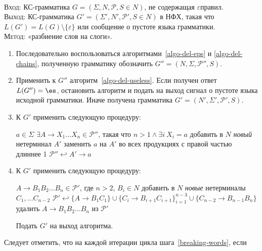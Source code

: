 \begin{NumAlgo}
\nspace\\
\textsc{Вход}: КС-грамматика $G=(\Sigma, N, \mathcal P, S \in N)$, не
содержащая $\varepsilon$\nbdash{}правил.\\ 
\textsc{Выход}: КС-грамматика
$G'=(\Sigma', N', \mathcal P', S \in N)$ в НФХ, такая что $L(G')=L(G) \setminus
\{ \varepsilon \}$ или сообщение о пустоте языка грамматики.\\
\textsc{Метод}: «разбиение слов на слоги».
\begin{enumerate}
    \item Последовательно воспользоваться
    алгоритмами~\ref{algo-del-eps} и \ref{algo-del-chains}, полученную
    грамматику обозначить $G'' = (N, \Sigma, \mathcal P'', S)$.
    \item Применить к $G''$ алгоритм~\ref{algo-del-useless}. Если получен ответ
    $L(G'')=\es$, остановить алгоритм и подать на выход сигнал о пустоте языка
    исходной грамматики. Иначе получена грамматика $G' = (N', \Sigma',
    \mathcal P', S)$.
    \item\label{process-terminals}К $G'$ применить следующую процедуру:
    \begin{codebox}
    \zi \For $a \in \Sigma$ 
    \zi \Do
            \If $\exists A \to X_1 \ldots X_n \in \mathcal P''$, такая что 
            $n > 1 \wedge \exists i\: X_i = a$
    \zi     \Then
    \li     добавить в $N$ \emph{новый} нетерминал $A'$
    \li     заменить $a$ на $A'$ во всех продукциях с правой частью длиннее 1
    \li     $\mathcal P'' \hookleftarrow A' \to a$
            \End
        \End
    \end{codebox}
    \item\label{breaking-words}К $G'$ применить следующую процедуру:
    \begin{codebox}
    \zi \For $A \to B_1 B_2 \ldots B_n \in \mathcal P'$, 
        где $n > 2$, $B_i \in N$ 
    \zi \Do
    \li     добавить в $N$ \emph{новые} нетерминалы $C_1, \ldots C_{n-2}$
    \li     $\mathcal P' \hookleftarrow 
            \{ A \to B_1C_1\} \cup \{ C_i \to B_{i+1} C_{i+1} \}_{i=1}^{n-3}
            \cup \{ C_{n-2} \to B_{n-1}B_n \}$ 
    \li     удалить $A \to B_1 B_2 \ldots B_n$ из $\mathcal P'$
        \End
    \end{codebox}
    Подать $G'$ на выход алгоритма.
\end{enumerate}
\begin{Remark}
Следует отметить, что на каждой итерации цикла шага~\ref{breaking-words}, если

\end{Remark}
\end{NumAlgo}
